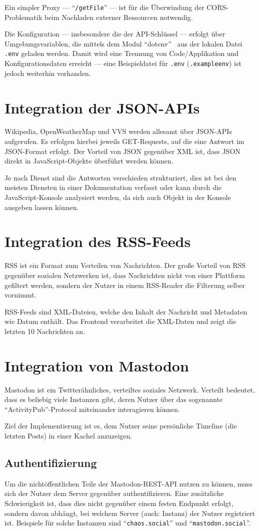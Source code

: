 \documentclass[fleqn,10pt]{SelfArx} %
\begin{document}
Ein simpler Proxy --- \enquote{\texttt{/getFile}} --- ist für die Über\-windung der CORS-Problematik beim Nachladen externer Ressourcen notwendig.

Die Konfiguration --- insbesondere die der API-Schlüssel --- erfolgt über Umgebungsvariablen, die mittels dem Modul \enquote{dotenv}~\cite{dotenv} aus der lokalen Datei \texttt{.env} geladen werden. Damit wird eine Trennung von Code/Applikation und Konfigurationsdaten erreicht --- eine Beispieldatei für \texttt{.env} (\texttt{.exampleenv}) ist jedoch weiterhin vorhanden.
\section{Integration der JSON-APIs}
Wikipedia, OpenWeatherMap und VVS werden allesamt über JSON-APIs aufgerufen. Es erfolgen hierbei jeweils GET-Requests, auf die eine Antwort im JSON-Format erfolgt. Der Vorteil von JSON gegenüber XML ist, dass JSON direkt in JavaScript-Objekte überführt werden können.

Je nach Dienst sind die Antworten verschieden strukturiert, dies ist bei den meisten Diensten in einer Dokumentation verfasst oder kann durch die JavaScript-Konsole analysiert werden, da sich auch Objekt in der Konsole ausgeben lassen können.
\section{Integration des RSS-Feeds}
RSS ist ein Format zum Verteilen von Nachrichten. Der große Vorteil von RSS gegenüber sozialen Netzwerken ist, dass Nachrichten nicht von einer Plattform gefiltert werden, sondern der Nutzer in einem RSS-Reader die Filterung selber vornimmt.

RSS-Feeds sind XML-Dateien, welche den Inhalt der Nachricht und Metadaten wie Datum enthält. Das Frontend verarbeitet die XML-Daten und zeigt die letzten 10 Nachrichten an.
\section{Integration von Mastodon}
Mastodon ist ein Twitterähnliches, verteiltes soziales Netzwerk. Verteilt bedeutet, dass es beliebig viele Instanzen gibt, deren Nutzer über das sogenannte \enquote{ActivityPub}-Protocol miteinander interagieren können.

Ziel der Implementierung ist es, dem Nutzer seine persön\-liche Timeline (die letzten Posts) in einer Kachel anzuzeigen.
\subsection{Authentifizierung}
Um die nichtöffentlichen Teile der Mastodon-REST-API nutzen zu können, muss sich der Nutzer dem Server gegenüber authentifizieren. Eine zusätzliche Schwierigkeit ist, dass dies nicht gegenüber einem festen Endpunkt erfolgt, sondern davon abhängt, bei welchem Server (auch: Instanz) der Nutzer registriert ist. Beispiele für solche Instanzen sind \enquote{\texttt{chaos.social}} und \enquote{\texttt{mastodon.social}}.
\end{document}
